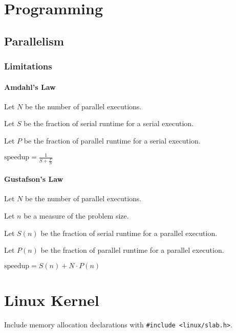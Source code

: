 \documentclass[12pt]{book}
\begin{document}
  \chapter{Programming}

  \section{Parallelism}

  \subsection{Limitations}

  \subsubsection{Amdahl's Law}

  Let $N$ be the number of parallel executions.

  \noindent Let $S$ be the fraction of serial runtime for a serial execution.

  \noindent Let $P$ be the fraction of parallel runtime for a serial execution.

  \vspace{1em}

  $\text{speedup} = \frac{1}{S + \frac{P}{N}}$

  \subsubsection{Gustafson's Law}

  Let $N$ be the number of parallel executions.

  \noindent Let $n$ be a measure of the problem size.

  \noindent Let $S(n)$ be the fraction of serial runtime for a parallel
  execution.

  \noindent Let $P(n)$ be the fraction of parallel runtime for a parallel
  execution.

  \vspace{1em}

  $\text{speedup} = S(n) + N \cdot P(n)$

  \chapter{Linux Kernel}

  Include memory allocation declarations with
  \texttt{#include <linux/slab.h>}.
\end{document}
